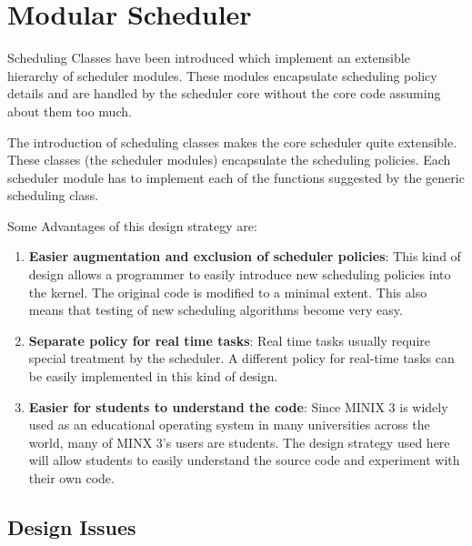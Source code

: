\chapter{Modular Scheduler}

Scheduling Classes have been introduced which implement an extensible hierarchy of
scheduler modules. These modules encapsulate scheduling policy
details and are handled by the scheduler core without the core
code assuming about them too much.

The introduction of scheduling classes makes the core scheduler quite extensible. These classes 
(the scheduler modules) encapsulate the scheduling policies. Each scheduler module has to implement each of
the functions suggested by the generic scheduling class.

Some Advantages of this design strategy are:
\begin{enumerate}
\item {\bfseries Easier augmentation and exclusion of scheduler policies}: This kind of design allows 
a programmer to easily introduce new scheduling policies into the kernel. The original code is modified
 to a minimal extent. This also means that testing of new scheduling algorithms become very easy.
\item {\bfseries Separate policy for real time tasks}: Real time tasks usually require special treatment by the scheduler.
A different policy for real-time tasks can be easily implemented in this kind of design.
\item {\bfseries Easier for students to understand the code}: Since MINIX 3 is widely used as an educational operating system
in many universities across the world, many of MINX 3's users are students. The design strategy used here will allow 
students to easily understand the source code and experiment with their own code.
\end{enumerate}

\section{Design Issues}

